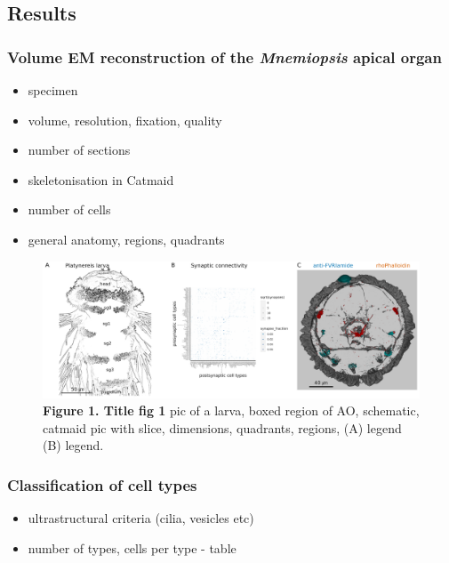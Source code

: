 \documentclass[
  11pt,
]{article}
\providecommand{\tightlist}{%
  \setlength{\itemsep}{0pt}\setlength{\parskip}{0pt}}\usepackage{longtable,booktabs,array}
\begin{document}
\subsection{Results}\label{results}

\subsubsection{\texorpdfstring{Volume EM reconstruction of the
\emph{Mnemiopsis} apical
organ}{Volume EM reconstruction of the Mnemiopsis apical organ}}\label{volume-em-reconstruction-of-the-mnemiopsis-apical-organ}

\begin{itemize}
\tightlist
\item
  specimen
\item
  volume, resolution, fixation, quality
\item
  number of sections
\item
  skeletonisation in Catmaid
\item
  number of cells
\item
  general anatomy, regions, quadrants
\end{itemize}

\begin{figure}[H]

{\centering \includegraphics[width=1\textwidth,height=\textheight]{figures/Figure1.png}

}

\caption{\textbf{Figure 1. Title fig 1} pic of a larva, boxed region of
AO, schematic, catmaid pic with slice, dimensions, quadrants, regions,
(A) legend (B) legend.}

\end{figure}%

\subsubsection{Classification of cell
types}\label{classification-of-cell-types}

\begin{itemize}
\tightlist
\item
  ultrastructural criteria (cilia, vesicles etc)
\item
  number of types, cells per type - table
\end{itemize}
\end{document}
